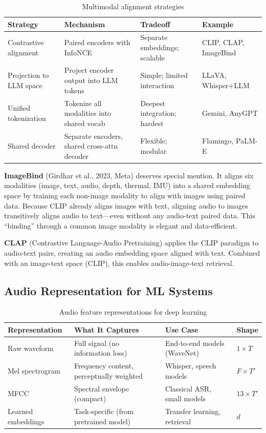 \begin{table}[H]
\centering
\caption{Multimodal alignment strategies}
\begin{tabularx}{\textwidth}{lXXl}
\toprule
\textbf{Strategy} & \textbf{Mechanism} & \textbf{Tradeoff} & \textbf{Example} \\
\midrule
Contrastive alignment & Paired encoders with InfoNCE & Separate embeddings; scalable & CLIP, CLAP, ImageBind \\
Projection to LLM space & Project encoder output into LLM tokens & Simple; limited interaction & LLaVA, Whisper+LLM \\
Unified tokenization & Tokenize all modalities into shared vocab & Deepest integration; hardest & Gemini, AnyGPT \\
Shared decoder & Separate encoders, shared cross-attn decoder & Flexible; modular & Flamingo, PaLM-E \\
\bottomrule
\end{tabularx}
\end{table}

\textbf{ImageBind} (Girdhar et al., 2023, Meta) deserves special mention. It aligns six modalities (image, text, audio, depth, thermal, IMU) into a shared embedding space by training each non-image modality to align with images using paired data. Because CLIP already aligns images with text, aligning audio to images transitively aligns audio to text---even without any audio-text paired data. This ``binding'' through a common image modality is elegant and data-efficient.

\textbf{CLAP} (Contrastive Language-Audio Pretraining) applies the CLIP paradigm to audio-text pairs, creating an audio embedding space aligned with text. Combined with an image-text space (CLIP), this enables audio-image-text retrieval.

\subsection{Audio Representation for ML Systems}

\begin{table}[H]
\centering
\caption{Audio feature representations for deep learning}
\begin{tabularx}{\textwidth}{lXXl}
\toprule
\textbf{Representation} & \textbf{What It Captures} & \textbf{Use Case} & \textbf{Shape} \\
\midrule
Raw waveform & Full signal (no information loss) & End-to-end models (WaveNet) & $1 \times T$ \\
Mel spectrogram & Frequency content, perceptually weighted & Whisper, speech models & $F \times T'$ \\
MFCC & Spectral envelope (compact) & Classical ASR, small models & $13 \times T'$ \\
Learned embeddings & Task-specific (from pretrained model) & Transfer learning, retrieval & $d$ \\
\bottomrule
\end{tabularx}
\end{table}

